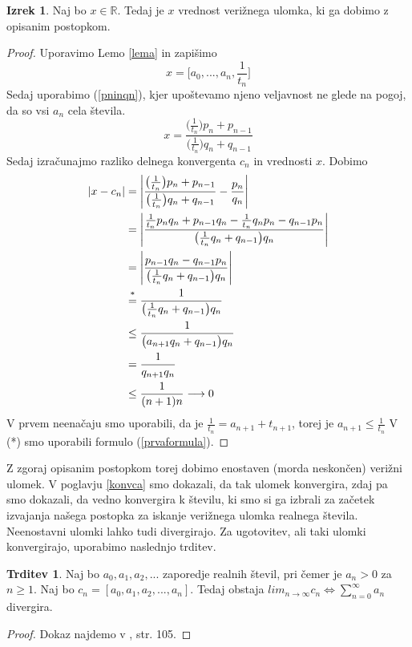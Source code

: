 \documentclass[a4paper,12pt]{article}
\newcommand{\R}{\mathbb{R}}
\newcommand{\equaltext}[1]{\ensuremath{\stackrel{\text{#1}}{=}}}
\theoremstyle{definition}
\theoremstyle{proposition}
\newtheorem{trd}{Trditev}[section]
\theoremstyle{theorem}
\newtheorem{iz}{Izrek}[section]
\theoremstyle{lemma}
\begin{document}
\begin{iz}
\label{postopek}
Naj bo $x \in \R$. Tedaj je $x$ vrednost verižnega ulomka, ki ga dobimo z opisanim postopkom.
\end{iz}
\begin{proof}
Uporavimo Lemo \ref{lema} in zapišimo
\[ x =\big[a_0,..., a_n, \frac{1}{t_n}\big]\]
Sedaj uporabimo (\ref{pninqn}), kjer upoštevamo njeno veljavnost ne glede na pogoj, da so vsi $a_n$ cela števila.
\[x=\frac{\big(\frac{1}{t_n}\big)p_n+p_{n-1}}{\big(\frac{1}{t_n}\big)q_n+q_{n-1}}\]
Sedaj izračunajmo razliko delnega konvergenta $c_n$ in vrednosti $x$. Dobimo
\begin{equation*}
\begin{split}
\left|x-c_n\right|   &=\left|\frac{\big(\frac{1}{t_n}\big)p_n+p_{n-1}}{\big(\frac{1}{t_n}\big)q_n+q_{n-1}}-\frac{p_n}{q_n}\right|\\
&= \left|\frac{\frac{1}{t_n}p_n q_n + p_{n-1}q_n - \frac{1}{t_n}q_n p_n - q_{n-1} p_n}{\big(\frac{1}{t_n}q_n+q_{n-1}\big)q_n}\right| \\
&= \left|\frac{p_{n-1}q_n - q_{n-1} p_n}{\big(\frac{1}{t_n}q_n+q_{n-1}\big)q_n}\right| \\
&\equaltext{\text{*}}{} \frac{1}{\big(\frac{1}{t_n}q_n+q_{n-1}\big)q_n} \\
&\leq \frac{1}{\big(a_{n+1}q_n + q_{n-1}\big)q_n} \\
&= \frac{1}{q_{n+1}q_n} \\
&\leq \frac{1}{(n+1)n} \longrightarrow 0
\end{split}
\end{equation*}
V prvem neenačaju smo uporabili, da je $\frac{1}{t_n} = a_{n+1}+t_{n+1}$, torej je $a_{n+1} \leq \frac{1}{t_n}$ V (*) smo uporabili formulo (\ref{prvaformula}).
\end{proof}

Z zgoraj opisanim postopkom torej dobimo enostaven (morda neskončen) verižni ulomek. V poglavju \ref{konvca} smo dokazali, da tak ulomek konvergira, zdaj pa smo dokazali, da vedno konvergira k številu, ki smo si ga izbrali za začetek izvajanja našega postopka za iskanje verižnega ulomka realnega števila.\\
Neenostavni ulomki lahko tudi divergirajo. Za ugotovitev, ali taki ulomki konvergirajo, uporabimo naslednjo trditev.

\begin{trd}
\label{divergenca}
Naj bo $a_0, a_1, a_2, ...$ zaporedje realnih števil, pri čemer je $a_n > 0$ za $n\geq1$. Naj bo $c_n = [a_0, a_1, a_2, ..., a_n]$. Tedaj obstaja $lim_{n\to\infty}c_n \Leftrightarrow \sum_{n=0}^{\infty}a_n$ divergira.
\end{trd}
\begin{proof}
Dokaz najdemo v \cite{teorijastevil}, str. 105.
\end{proof}
\end{document}
